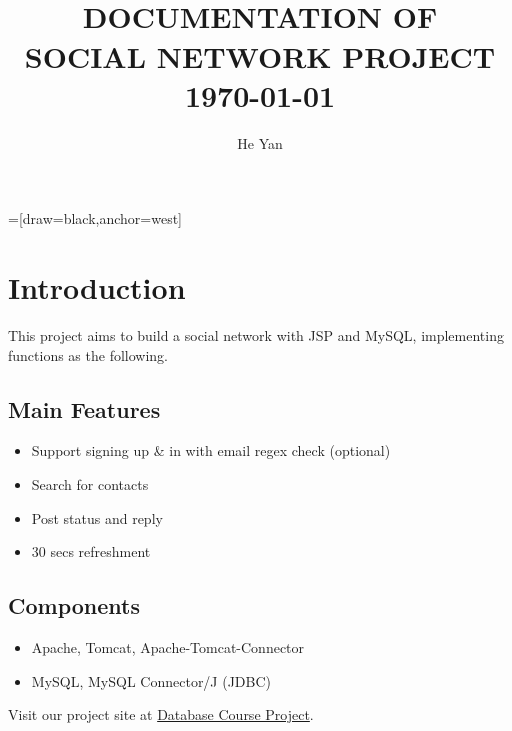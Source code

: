 


=[draw=black,anchor=west]
\title{
        \HRule{2pt}\\
        \LARGE \textbf{\uppercase{Documentation of\\ Social Network Project}}
        \HRule{2pt} \\ [0.5cm]
        \normalsize \today \vspace*{5\baselineskip}}

\date{}

\author{He Yan}

\maketitle
\tableofcontents
\setcounter{page}{0}
\thispagestyle{empty}
\newpage

\section{Introduction}

This project aims to build a social network with JSP and MySQL, implementing functions as the following.

\subsection{Main Features}
\begin{itemize}
	\item Support signing up \& in with email regex check (optional)
	\item Search for contacts
	\item Post status and reply
	\item 30 secs refreshment
\end{itemize}

\subsection{Components}
\begin{itemize}
	\item Apache, Tomcat, Apache-Tomcat-Connector
	\item MySQL, MySQL Connector/J (JDBC)
\end{itemize}

Visit our project site at \href{http://54.250.244.23/database-project/db/main.jsp}{Database Course Project}.

